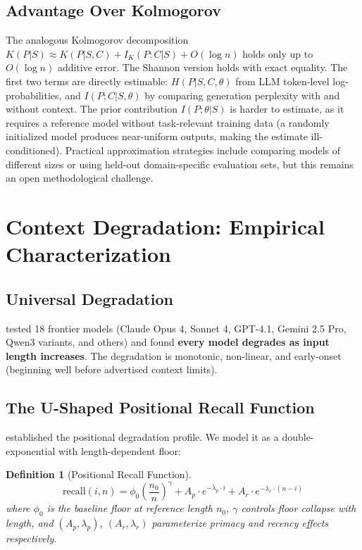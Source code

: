 \documentclass[11pt, a4paper, logo, copyright]{googledeepmind}
\newtheorem{definition}{Definition}[section]
\begin{document}
\subsection{Advantage Over Kolmogorov}

The analogous Kolmogorov decomposition $K(P|S) \approx K(P|S,C) + I_K(P:C|S) + O(\log n)$ holds only up to $O(\log n)$ additive error. The Shannon version holds with exact equality. The first two terms are directly estimable: $H(P|S,C,\theta)$ from LLM token-level log-probabilities, and $I(P;C|S,\theta)$ by comparing generation perplexity with and without context. The prior contribution $I(P;\theta|S)$ is harder to estimate, as it requires a reference model without task-relevant training data (a randomly initialized model produces near-uniform outputs, making the estimate ill-conditioned). Practical approximation strategies include comparing models of different sizes or using held-out domain-specific evaluation sets, but this remains an open methodological challenge.


\section{Context Degradation: Empirical Characterization}
\label{sec:degradation}

\subsection{Universal Degradation}

\citet{chroma2025contextrot} tested 18 frontier models (Claude Opus 4, Sonnet 4, GPT-4.1, Gemini 2.5 Pro, Qwen3 variants, and others) and found \textbf{every model degrades as input length increases}. The degradation is monotonic, non-linear, and early-onset (beginning well before advertised context limits).

\subsection{The U-Shaped Positional Recall Function}

\citet{liu2024lost} established the positional degradation profile. We model it as a double-exponential with length-dependent floor:

\begin{definition}[Positional Recall Function]
\label{def:recall}
$$\text{recall}(i, n) = \phi_0 \left(\frac{n_0}{n}\right)^{\!\gamma} + A_p \cdot e^{-\lambda_p \cdot i} + A_r \cdot e^{-\lambda_r \cdot (n - i)}$$
where $\phi_0$ is the baseline floor at reference length $n_0$, $\gamma$ controls floor collapse with length, and $(A_p, \lambda_p)$, $(A_r, \lambda_r)$ parameterize primacy and recency effects respectively.
\end{definition}
\end{document}
